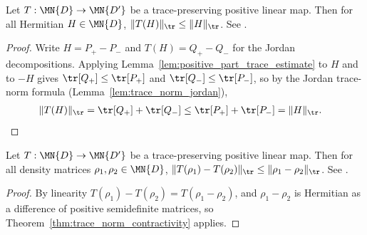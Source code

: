 \begin{theorem}
    \label{thm:trace_norm_contractivity}
    \leanok
    Let $T:\MN{D}\to\MN{D'}$ be a trace-preserving positive linear map.
    Then for all Hermitian $H\in\MN{D}$,
    $\lVert T(H)\rVert_{\tr}\leq\lVert H\rVert_{\tr}$.
    See \cite[Chapter~8, Theorem~8.16]{Wolf2012Quantum}.
\end{theorem}

\begin{proof}\leanok
    Write $H=P_+-P_-$ and $T(H)=Q_+-Q_-$ for the Jordan decompositions.
    Applying Lemma~\ref{lem:positive_part_trace_estimate} to $H$ and to
    $-H$ gives $\tr[Q_+]\leq\tr[P_+]$ and
    $\tr[Q_-]\leq\tr[P_-]$, so by the Jordan
    trace-norm formula (Lemma~\ref{lem:trace_norm_jordan}),
    \begin{align}
        \lVert T(H)\rVert_{\tr}
         & =\tr[Q_+]+\tr[Q_-]
        \leq\tr[P_+]+\tr[P_-]
        =\lVert H\rVert_{\tr}.
        \notag
    \end{align}
\end{proof}

\begin{corollary}
    \label{cor:trace_norm_contractivity_states}
    \leanok
    Let $T:\MN{D}\to\MN{D'}$ be a trace-preserving positive linear map.
    Then for all density matrices $\rho_1,\rho_2\in\MN{D}$,
    $\lVert T(\rho_1)-T(\rho_2)\rVert_{\tr}
        \leq\lVert\rho_1-\rho_2\rVert_{\tr}$.
    See \cite[Chapter~8, Eq.~(8.80)]{Wolf2012Quantum}.
\end{corollary}

\begin{proof}\leanok
    By linearity $T(\rho_1)-T(\rho_2)=T(\rho_1-\rho_2)$, and
    $\rho_1-\rho_2$ is Hermitian as a difference of positive semidefinite
    matrices, so Theorem~\ref{thm:trace_norm_contractivity} applies.
\end{proof}

